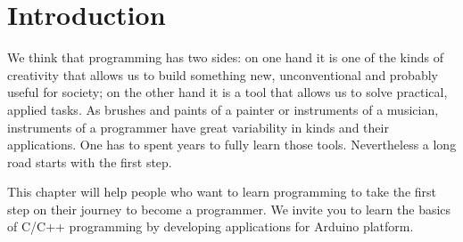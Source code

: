 \documentclass[../sparc.tex]{subfiles}
\begin{document}
\section{Introduction}

We think that programming has two sides: on one hand it is one of the kinds of
creativity that allows us to build something new, unconventional and probably
useful for society; on the other hand it is a tool that allows us to solve
practical, applied tasks.  As brushes and paints of a painter or instruments of
a musician, instruments of a programmer have great variability in kinds and
their applications.  One has to spent years to fully learn those tools.
Nevertheless a long road starts with the first step.

This chapter will help people who want to learn programming to take the first
step on their journey to become a programmer.  We invite you to learn the basics
of C/C++ programming by developing applications for Arduino platform.
\end{document}
